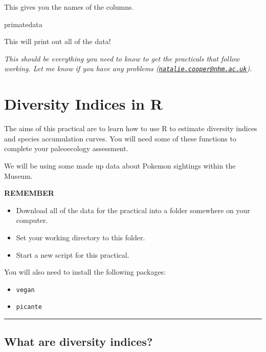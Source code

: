 \documentclass[]{book}
\newenvironment{Shaded}{\begin{snugshade}}{\end{snugshade}}
\newcommand{\NormalTok}[1]{{#1}}
\providecommand{\tightlist}{%
  \setlength{\itemsep}{0pt}\setlength{\parskip}{0pt}}
\begin{document}
This gives you the names of the columns.

\begin{Shaded}
\begin{Highlighting}[]
\NormalTok{primatedata}
\end{Highlighting}
\end{Shaded}

This will print out all of the data!

\emph{This should be everything you need to know to get the practicals
that follow working. Let me know if you have any problems
(\href{mailto:natalie.cooper@nhm.ac.uk}{\nolinkurl{natalie.cooper@nhm.ac.uk}}).}

\chapter{Diversity Indices in R}\label{diversity-indices-in-r}

The aims of this practical are to learn how to use R to estimate
diversity indices and species accumulation curves. You will need some of
these functions to complete your paleoecology assessment.

We will be using some made up data about Pokemon sightings within the
Museum.

\textbf{REMEMBER}

\begin{itemize}
\tightlist
\item
  Download all of the data for the practical into a folder somewhere on
  your computer.
\item
  Set your working directory to this folder.
\item
  Start a new script for this practical.
\end{itemize}

You will also need to install the following packages:

\begin{itemize}
\tightlist
\item
  \texttt{vegan}
\item
  \texttt{picante}
\end{itemize}

\begin{center}\rule{0.5\linewidth}{\linethickness}\end{center}

\section{What are diversity indices?}\label{what-are-diversity-indices}
\end{document}
